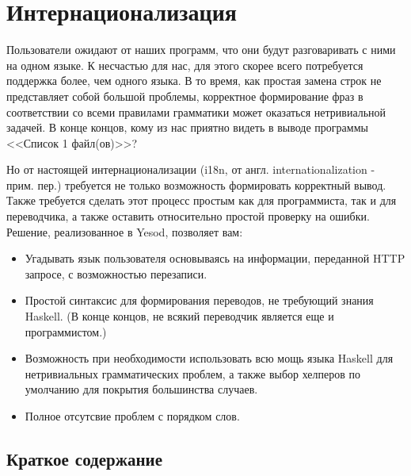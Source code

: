 \chapter{Интернационализация} %

Пользователи ожидают от наших программ, что они будут разговаривать с ними на одном языке. К несчастью для нас, для этого скорее всего потребуется поддержка более, чем одного языка. В то время, как простая замена строк не представляет собой большой проблемы, корректное формирование фраз в соответствии со всеми правилами грамматики может оказаться нетривиальной задачей. В конце концов, кому из нас приятно видеть в выводе программы <<Список 1 файл(ов)>>?

Но от настоящей интернационализации (i18n, от англ. internationalization - прим. пер.) требуется не только возможность формировать корректный вывод. Также требуется сделать этот процесс простым как для программиста, так и для переводчика, а также оставить относительно простой проверку на ошибки. Решение, реализованное в Yesod, позволяет вам:

\begin{itemize}
  \item Угадывать язык пользователя основываясь на информации, переданной HTTP запросе, с возможностью перезаписи.
  \item Простой синтаксис для формирования переводов, не требующий знания Haskell. (В конце концов, не всякий переводчик является еще и программистом.)
  \item Возможность при необходимости использовать всю мощь языка Haskell для нетривиальных грамматических проблем, а также выбор хелперов по умолчанию для покрытия большинства случаев.
  \item Полное отсутсвие проблем с порядком слов. %
\end{itemize}

\section{Краткое содержание} %

